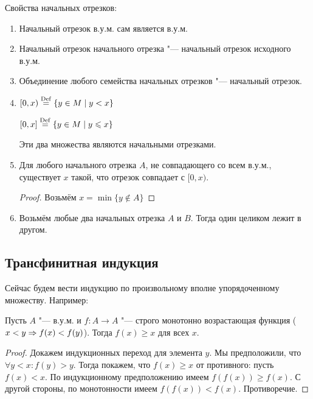Свойства начальных отрезков:
\begin{enumerate}
	\item
		Начальный отрезок в.у.м. сам является в.у.м.
	\item
		Начальный отрезок начального отрезка "--- начальный отрезок исходного в.у.м.
	\item
		Объединение любого семейства начальных отрезков "--- начальный отрезок.
	\item
		\begin{Def}
			$[0, x) \stackrel{\mathrm{Def}}{=} \{ y \in M \mid y < x\}$
		
			$[0, x] \stackrel{\mathrm{Def}}{=} \{ y \in M \mid y \leqslant x \}$
		\end{Def}
		Эти два множества являются начальными отрезками.
	\item
		Для любого начального отрезка $A$, не совпадающего со всем в.у.м., существует $x$ такой,
		что отрезок совпадает с $[0, x)$.
		\begin{proof}
			Возьмём $x = \min \{ y \notin A \}$
		\end{proof}
	\item
		Возьмём любые два начальных отрезка $A$ и $B$.
		Тогда один целиком лежит в другом.
\end{enumerate}

\subsection{Трансфинитная индукция}
Сейчас будем вести индукцию по произвольному вполне упорядоченному множеству.
Например:

\begin{theorem}
	Пусть $A$ "--- в.у.м. и $f \colon A \to A$ "--- строго монотонно возрастающая функция ($x < y \Rightarrow f(x) < f(y)$).
	Тогда $f(x) \ge x$ для всех $x$.
\end{theorem}
\begin{proof}
	Докажем индукционных переход для элемента $y$.
	Мы предположили, что $\forall y < x \colon f(y) > y$.
	Тогда покажем, что $f(x) \ge x$ от противного: пусть $f(x) < x$.
	По индукционному предположению имеем $f(f(x)) \ge f(x)$.
	С другой стороны, по монотонности имеем $f(f(x)) < f(x)$.
	Противоречие.
\end{proof}

